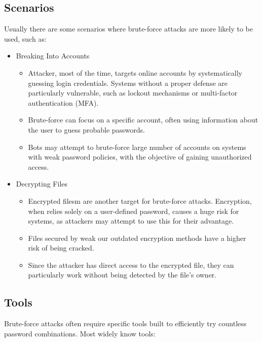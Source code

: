 \documentclass{comjnl}
\begin{document}
\subsection*{Scenarios}
Usually there are some scenarios where brute-force attacks are more likely to be used, such as:

\begin{itemize}
  \item Breaking Into Accounts
  \begin{itemize}
    \item Attacker, most of the time, targets online accounts by systematically guessing login credentials. Systems without a proper defense are particularly vulnerable, such as  lockout mechanisms or multi-factor authentication (MFA).
    \item Brute-force can focus on a specific account, often using information about the user to guess probable passwords.
    \item Bots may attempt to brute-force large number of accounts on systems with weak password policies, with the objective of gaining unauthorized access.
  \end{itemize}  
  \item Decrypting Files
  \begin{itemize}
    \item Encrypted filesm are another target for brute-force attacks. Encryption, when relies solely on a user-defined password, causes a huge risk for systems, as attackers may attempt to use this for their advantage.
    \item Files secured by weak our outdated encryption methods have a higher risk of being cracked.
    \item Since the attacker has direct access to the encrypted file, they can particularly work without being detected by the file's owner.
  \end{itemize}
\end{itemize}

\subsection*{Tools}
Brute-force attacks often require specific tools built to efficiently try countless password combinations. Most widely know tools:
\end{document}
